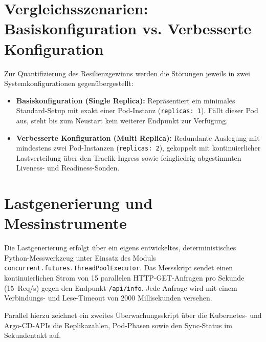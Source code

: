 \section{Vergleichsszenarien: Basiskonfiguration vs. Verbesserte Konfiguration}
\label{sec:basis-vs-verbessert}
Zur Quantifizierung des Resilienzgewinns werden die Störungen jeweils in zwei Systemkonfigurationen gegenübergestellt:
\begin{itemize}
    \item \textbf{Basiskonfiguration (Single Replica):} Repräsentiert ein minimales Standard-Setup mit exakt einer Pod-Instanz (\texttt{replicas: 1}). Fällt dieser Pod aus, steht bis zum Neustart kein weiterer Endpunkt zur Verfügung.
    \item \textbf{Verbesserte Konfiguration (Multi Replica):} Redundante Auslegung mit mindestens zwei Pod-Instanzen (\texttt{replicas: 2}), gekoppelt mit kontinuierlicher Lastverteilung über den Traefik-Ingress sowie feingliedrig abgestimmten Liveness- und Readiness-Sonden.
\end{itemize}

\section{Lastgenerierung und Messinstrumente}
\label{sec:lastprofil-werkzeuge}
Die Lastgenerierung erfolgt über ein eigens entwickeltes, deterministisches Python-Messwerkzeug unter Einsatz des Moduls \texttt{concurrent.futures.ThreadPoolExecutor}. Das Messskript sendet einen kontinuierlichen Strom von 15 parallelen HTTP-GET-Anfragen pro Sekunde (15~Req/s) gegen den Endpunkt \texttt{/api/info}. Jede Anfrage wird mit einem Verbindungs- und Lese-Timeout von 2000 Millisekunden versehen.

Parallel hierzu zeichnet ein zweites Überwachungsskript über die Kubernetes- und Argo-CD-APIs die Replikazahlen, Pod-Phasen sowie den Sync-Status im Sekundentakt auf.

